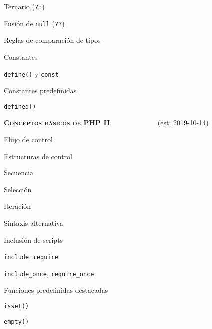 \begin{longenum}
\begin{longenum}
\begin{longenum}
\begin{longenum}
                \item Ternario (\texttt{?:})
                \item Fusión de \texttt{null} (\texttt{??})
                \item Reglas de comparación de tipos
            \end{longenum}
        \end{longenum}
        \item Constantes
        \begin{longenum}
            \item \texttt{define()} y \texttt{const}
            \item Constantes predefinidas
            \item \texttt{defined()}
        \end{longenum}
    \end{longenum}
    \item \textbf{\textsc{Conceptos básicos de PHP II}} \ \ \ \ \ \ \ \ \ \ \ \ \ (est: \mbox{2019-10-14})
    \begin{longenum}
        \item Flujo de control
        \begin{longenum}
            \item Estructuras de control
            \begin{longenum}
                \item Secuencia
                \item Selección
                \item Iteración
                \item Sintaxis alternativa
            \end{longenum}
            \item Inclusión de scripts
            \begin{longenum}
                \item \texttt{include}, \texttt{require}
                \item \texttt{include\_once}, \texttt{require\_once}
            \end{longenum}
        \end{longenum}
        \item Funciones predefinidas destacadas
        \begin{longenum}
            \item \texttt{isset()}
            \item \texttt{empty()}

\end{longenum}
\end{longenum}
\end{longenum}
